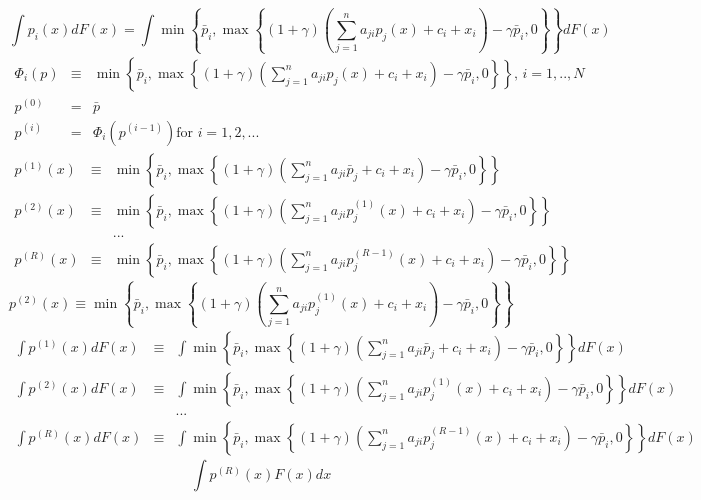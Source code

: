 \documentclass{article}
\begin{document}
\[
\int p_{i}\left( x\right) dF\left( x\right) =\int \min \left\{ \bar{p}%
_{i},\max \left\{ \left( 1+\gamma \right) \left(
\sum_{j=1}^{n}a_{ji}p_{j}\left( x\right) +c_{i}+x_{i}\right) -\gamma \bar{p}%
_{i},0\right\} \right\} dF\left( x\right) 
\]%
\begin{eqnarray*}
\Phi _{i}\left( p\right) &\equiv &\min \left\{ \bar{p}_{i},\max \left\{
\left( 1+\gamma \right) \left( \sum_{j=1}^{n}a_{ji}p_{j}\left( x\right)
+c_{i}+x_{i}\right) -\gamma \bar{p}_{i},0\right\} \right\} \text{, }i=1,..,N
\\
p^{\left( 0\right) } &=&\bar{p} \\
p^{\left( i\right) } &=&\Phi _{i}\left( p^{\left( i-1\right) }\right) \text{
for }i=1,2,...
\end{eqnarray*}%
\begin{eqnarray*}
p^{\left( 1\right) }\left( x\right) &\equiv &\min \left\{ \bar{p}_{i},\max
\left\{ \left( 1+\gamma \right) \left( \sum_{j=1}^{n}a_{ji}\bar{p}%
_{j}+c_{i}+x_{i}\right) -\gamma \bar{p}_{i},0\right\} \right\} \\
p^{\left( 2\right) }\left( x\right) &\equiv &\min \left\{ \bar{p}_{i},\max
\left\{ \left( 1+\gamma \right) \left( \sum_{j=1}^{n}a_{ji}p_{j}^{\left(
1\right) }\left( x\right) +c_{i}+x_{i}\right) -\gamma \bar{p}_{i},0\right\}
\right\} \\
&&... \\
p^{\left( R\right) }\left( x\right) &\equiv &\min \left\{ \bar{p}_{i},\max
\left\{ \left( 1+\gamma \right) \left( \sum_{j=1}^{n}a_{ji}p_{j}^{\left(
R-1\right) }\left( x\right) +c_{i}+x_{i}\right) -\gamma \bar{p}%
_{i},0\right\} \right\}
\end{eqnarray*}%
\[
p^{\left( 2\right) }\left( x\right) \equiv \min \left\{ \bar{p}_{i},\max
\left\{ \left( 1+\gamma \right) \left( \sum_{j=1}^{n}a_{ji}p_{j}^{\left(
1\right) }\left( x\right) +c_{i}+x_{i}\right) -\gamma \bar{p}_{i},0\right\}
\right\} 
\]%
\begin{eqnarray*}
\int p^{\left( 1\right) }\left( x\right) dF\left( x\right) &\equiv &\int
\min \left\{ \bar{p}_{i},\max \left\{ \left( 1+\gamma \right) \left(
\sum_{j=1}^{n}a_{ji}\bar{p}_{j}+c_{i}+x_{i}\right) -\gamma \bar{p}%
_{i},0\right\} \right\} dF\left( x\right) \\
\int p^{\left( 2\right) }\left( x\right) dF\left( x\right) &\equiv &\int
\min \left\{ \bar{p}_{i},\max \left\{ \left( 1+\gamma \right) \left(
\sum_{j=1}^{n}a_{ji}p_{j}^{\left( 1\right) }\left( x\right)
+c_{i}+x_{i}\right) -\gamma \bar{p}_{i},0\right\} \right\} dF\left( x\right)
\\
&&... \\
\int p^{\left( R\right) }\left( x\right) dF\left( x\right) &\equiv &\int
\min \left\{ \bar{p}_{i},\max \left\{ \left( 1+\gamma \right) \left(
\sum_{j=1}^{n}a_{ji}p_{j}^{\left( R-1\right) }\left( x\right)
+c_{i}+x_{i}\right) -\gamma \bar{p}_{i},0\right\} \right\} dF\left( x\right)
\end{eqnarray*}%
\[
\int p^{\left( R\right) }\left( x\right) F\left( x\right) dx 
\]
\end{document}
